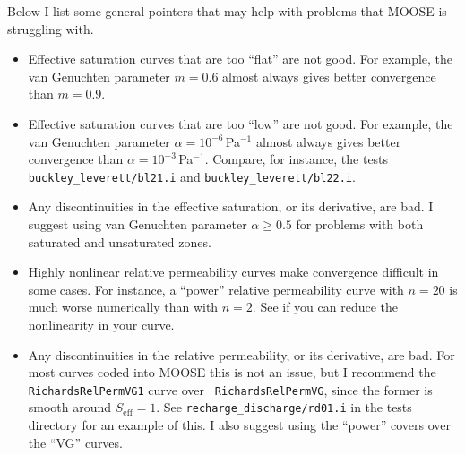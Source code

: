 \documentclass[]{scrreprt}
\begin{document}
Below I list some general pointers that may help with problems that
MOOSE is struggling with.
\begin{itemize}
\item Effective saturation curves that are too ``flat'' are not good.
  For example, the van Genuchten parameter $m=0.6$ almost always gives
  better convergence than $m=0.9$.
\item Effective saturation curves that are too ``low'' are not good.
  For example, the van Genuchten parameter $\alpha=10^{-6}$\,Pa$^{-1}$
  almost always gives better convergence than
  $\alpha=10^{-3}$\,Pa$^{-1}$.  Compare, for instance, the tests {\tt
    buckley\_leverett/bl21.i} and {\tt buckley\_leverett/bl22.i}.
\item Any discontinuities in the effective saturation, or its
  derivative, are bad.  I suggest using van Genuchten parameter
  $\alpha\geq 0.5$ for problems with both saturated and unsaturated zones.
\item Highly nonlinear relative permeability curves make convergence
  difficult in some cases.  For instance, a ``power'' relative
  permeability curve with $n=20$ is much worse numerically than with
  $n=2$.  See if you can reduce the nonlinearity in your curve.
\item Any discontinuities in the relative permeability, or its derivative,
  are bad.  For most curves coded into MOOSE this is not an issue, but
  I recommend the {\tt RichardsRelPermVG1} curve over {\tt
    RichardsRelPermVG}, since the former is smooth around
  $S_{\mathrm{eff}}=1$.  See {\tt recharge\_discharge/rd01.i} in the
  tests directory for an example of this.   I also suggest using the
  ``power'' covers over the ``VG'' curves.
\end{itemize}
\end{document}
